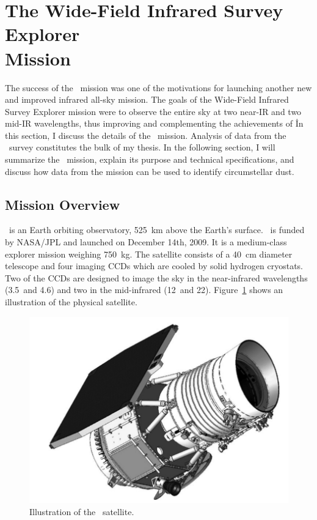    
\section{The Wide-Field Infrared Survey Explorer\\ Mission}\label{sec:wise_intro}

    The success of the \iras\ mission was one of the motivations for launching another new and improved infrared all-sky mission. The goals of the Wide-Field Infrared Survey Explorer mission \citep[\;][]{Wright2010} were to observe the entire sky at two near-IR and two mid-IR wavelengths, thus improving and complementing the achievements of \iras\. In this section, I discuss the details of the \WS\ mission. Analysis of data from the \WS\ survey constitutes the bulk of my thesis. In the following section, I will summarize the \WS\ mission, explain its purpose and technical specifications, and discuss how data from the mission can be used to identify circumstellar dust. 
   

    \subsection{Mission Overview}\label{sec:wise_overview}


    \WS\ is an Earth orbiting observatory, 525~km above the Earth's surface. \WS\ is funded by NASA/JPL and launched on December 14th, 2009. It is a medium-class explorer mission weighing 750~kg. The satellite consists of a 40~cm diameter telescope and four imaging CCDs which are cooled by solid hydrogen cryostats. Two of the CCDs are designed to image the sky in the near-infrared wavelengths (3.5\micron\ and 4.6\micron) and two in the mid-infrared (12\micron\ and 22\micron). Figure~\ref{fig:WISE_Satellite} shows an illustration of the physical satellite. 
  
    
    \begin{figure}
    \centering
    \includegraphics[width=\textwidth]{Ch2/wise_satellite}
    \caption[\WS\ Satellite]{Illustration of the \WS\ satellite.}
    \label{fig:WISE_Satellite}
    \end{figure}
    
